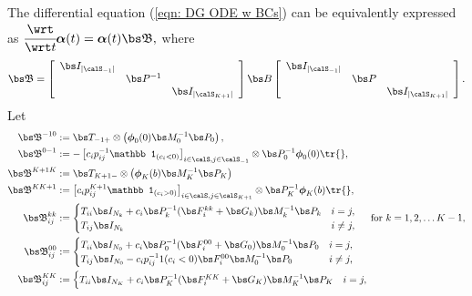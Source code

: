 The differential equation (\ref{eqn: DG ODE w BCs}) can be equivalently expressed as 
\(\label{eqn: DG alpha ODE w BCs}
	\cfrac{\wrt}{\wrt t} \boldsymbol \alpha(t)
	= \boldsymbol \alpha(t)  { \mathfrak{\bs B}},
\)
where 
\[ {\mathfrak{\bs B}} = \left[\begin{array}{ccc}
		\bs I_{|\calS_{-1}|} & & \\
		& \bs P^{-1} &  \\
		& & \bs I_{|\calS_{K+1}|}
	\end{array}\right]
	\bs B
	\left[\begin{array}{ccc}
		\bs I_{|\calS_{-1}|} & & \\
		& \bs P&  \\
		& & \bs I_{|\calS_{K+1}|}
	\end{array}\right].\] 
Let
\begin{align*}
 {  {\mathfrak{\bs B}}}^{{-1}0} &:= \bs T_{{-1}+}\otimes\left( \boldsymbol\phi_0(0)\bs M_0^{-1}\bs P_0\right),
 \\ {  {\mathfrak{\bs B}}}^{0{-1}} &:=-\left[c_ip_{ij}^{-1}\mathbb 1_{(c_i<0)}\right]_{i\in\calS,j\in\calS_{{-1}}}\otimes \bs P_0^{-1}\boldsymbol \phi_0(0)\tr{},
 \\ {  {\mathfrak{\bs B}}}^{{K+1} K} &:= \bs T_{{K+1}-}\otimes \left(\boldsymbol\phi_K(b)\bs M_K^{-1}\bs P_K\right)
 \\ {  {\mathfrak{\bs B}}}^{K {K+1}} &:= \left[c_ip_{ij}^{K+1}\mathbb 1_{(c_i>0)}\right]_{i\in\calS,j\in\calS_{K+1}} \otimes  \bs P_K^{-1} \boldsymbol\phi_K(b)\tr{},
 \\\mathfrak{\bs B}^{kk}_{ij} &:= \begin{cases}
    	T_{ii}\bs I_{N_k} + c_i\bs P_k^{-1}(\bs F_i^{kk}+\bs G_k)\bs M_k^{-1}\bs P_k & i = j, \\
	T_{ij}\bs I_{N_k} & i \neq j,
    \end{cases}\quad \mbox{ for \(k=1,2,\dots K-1\),}
 \\\mathfrak{\bs B}^{00}_{ij} &:= \begin{cases}
	T_{ii}\bs I_{N_0} + c_i\bs P_0^{-1}(\bs F_i^{00}+\bs G_0)\bs M_0^{-1}\bs P_0 & i = j, \\
T_{ij}\bs I_{N_0} - c_ip_{ij}^{-1} 1(c_i<0)\bs F_i^{00}\bs M_0^{-1}\bs P_0 & i \neq j,
\end{cases}
%
\\\mathfrak{\bs B}^{KK}_{ij} &:= \begin{cases}
	T_{ii}\bs I_{N_K} + c_i\bs P_K^{-1}(\bs F_i^{KK}+\bs G_K)\bs M_K^{-1}\bs P_K & i = j, \\

\end{cases}
\end{align*}
